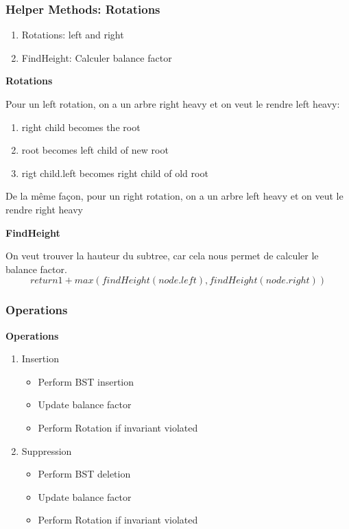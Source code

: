 \documentclass{article}
\begin{document}
\subsubsection{Helper Methods: Rotations}%
\label{ssub:Helper Methods}

\begin{enumerate}
    \item Rotations: left and right
    \item FindHeight: Calculer balance factor
\end{enumerate}

\textbf{Rotations}

Pour un left rotation, on a un arbre right heavy et on veut le rendre
left heavy:
\begin{enumerate}
    \item right child becomes the root
    \item root becomes left child of new root
    \item rigt child.left becomes right child of old root
\end{enumerate}

De la même façon, pour un right rotation, on a un arbre left heavy et
on veut le rendre right heavy

\textbf{FindHeight}

On veut trouver la hauteur du subtree, car cela nous permet de calculer le
balance factor.
$$ return 1 + max(findHeight(node.left), findHeight(node.right)) $$

\subsubsection{Operations}%
\label{ssub:Operations}

\textbf{Operations}

\begin{enumerate}
    \item Insertion
	\begin{itemize}
	    \item Perform BST insertion
	    \item Update balance factor
	    \item Perform Rotation if invariant violated
	\end{itemize}
    \item Suppression
	\begin{itemize}
	    \item Perform BST deletion
	    \item Update balance factor
	    \item Perform Rotation if invariant violated
	\end{itemize}
\end{enumerate}
\end{document}
